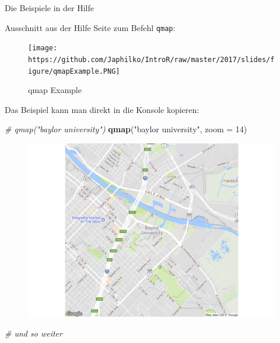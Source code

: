 \documentclass[ignorenonframetext,]{beamer}
\newenvironment{Shaded}{}{}
\newcommand{\KeywordTok}[1]{\textcolor[rgb]{0.00,0.44,0.13}{\textbf{{#1}}}}
\newcommand{\DataTypeTok}[1]{\textcolor[rgb]{0.56,0.13,0.00}{{#1}}}
\newcommand{\DecValTok}[1]{\textcolor[rgb]{0.25,0.63,0.44}{{#1}}}
\newcommand{\StringTok}[1]{\textcolor[rgb]{0.25,0.44,0.63}{{#1}}}
\newcommand{\CommentTok}[1]{\textcolor[rgb]{0.38,0.63,0.69}{\textit{{#1}}}}
\newcommand{\NormalTok}[1]{{#1}}
\begin{document}
\begin{frame}[fragile]{Die Beispiele in der Hilfe}

Ausschnitt aus der Hilfe Seite zum Befehl \texttt{qmap}:

\begin{figure}[htbp]
\centering
\texttt{[image: https://github.com/Japhilko/IntroR/raw/master/2017/slides/figure/qmapExample.PNG]}
\caption{qmap Example}
\end{figure}

Das Beispiel kann man direkt in die Konsole kopieren:

\begin{Shaded}
\begin{Highlighting}[]
\CommentTok{# qmap("baylor university")}
\KeywordTok{qmap}\NormalTok{(}\StringTok{"baylor university"}\NormalTok{, }\DataTypeTok{zoom =} \DecValTok{14}\NormalTok{)}
\end{Highlighting}
\end{Shaded}

\begin{figure}[htbp]
\centering
\includegraphics{RSocialScience2_files/figure-beamer/unnamed-chunk-33-1.pdf}
\caption{}
\end{figure}

\begin{Shaded}
\begin{Highlighting}[]
\CommentTok{# und so weiter}
\end{Highlighting}
\end{Shaded}

\end{frame}
\end{document}
